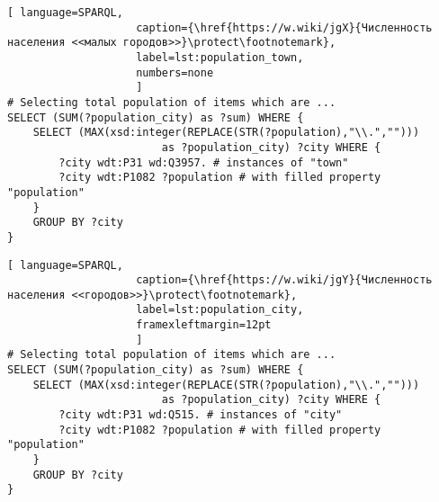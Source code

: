 \newpage
{}
\begin{lstlisting}[ language=SPARQL, 
                    caption={\href{https://w.wiki/jgX}{Численность населения <<малых городов>>}\protect\footnotemark},
                    label=lst:population_town,
                    numbers=none
                    ]
# Selecting total population of items which are ...
SELECT (SUM(?population_city) as ?sum) WHERE {                    
	SELECT (MAX(xsd:integer(REPLACE(STR(?population),"\\.",""))) 
						as ?population_city) ?city WHERE {
		?city wdt:P31 wd:Q3957.	# instances of "town"
		?city wdt:P1082 ?population # with filled property "population"                                  
	}
	GROUP BY ?city
}
\end{lstlisting}


\begin{lstlisting}[ language=SPARQL, 
                    caption={\href{https://w.wiki/jgY}{Численность населения <<городов>>}\protect\footnotemark},
                    label=lst:population_city,
                    framexleftmargin=12pt
                    ]
# Selecting total population of items which are ...
SELECT (SUM(?population_city) as ?sum) WHERE {                    
	SELECT (MAX(xsd:integer(REPLACE(STR(?population),"\\.",""))) 
						as ?population_city) ?city WHERE {
		?city wdt:P31 wd:Q515. # instances of "city"
		?city wdt:P1082 ?population # with filled property "population"
	}
	GROUP BY ?city
}\end{lstlisting}

